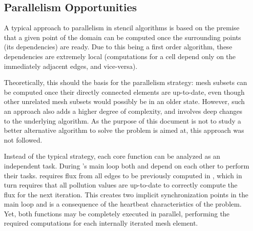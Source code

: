 \subsection{Parallelism Opportunities}
\label{sec:220}


A typical approach to parallelism in stencil algorithms is based on the premise that a given point of the domain can be computed once the surrounding points (its dependencies) are ready.
Due to this being a first order algorithm, these dependencies are extremely local (computations for a cell depend only on the immediately adjacent edges, and vice-versa).

Theoretically, this should the basis for the parallelism strategy: mesh subsets can be computed once their directly connected elements are up-to-date, even though other unrelated mesh subsets would possibly be in an older state.
However, such an approach also adds a higher degree of complexity, and involves deep changes to the underlying algorithm.
As the purpose of this document is not to study a better alternative algorithm to solve the problem \polu is aimed at, this approach was not followed.

Instead of the typical strategy, each core function can be analyzed as an independent task. During \polu's main loop both \computeflux and \update depend on each other to perform their tasks. \update requires flux from all edges to be previously computed in \computeflux, which in turn requires that all pollution values are up-to-date to correctly compute the flux for the next iteration. This creates two implicit synchronization points in the main loop and is a consequence of the heartbeat characteristics of the problem. Yet, both functions may be completely executed in parallel, performing the required computations for each internally iterated mesh element.

